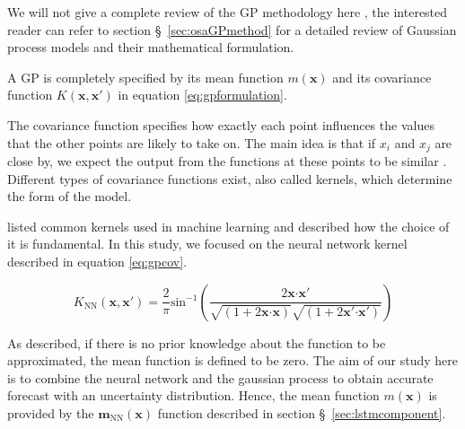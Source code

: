 We will not give a complete review of the GP methodology here , the interested reader can refer to 
section \S~\ref{sec:osaGPmethod} for a detailed review of Gaussian process models and their mathematical formulation.

A GP is completely specified by its mean function  \( m \left( \mathbf{x} \right)  \) and its covariance function  
\( K (\mathbf{x}, \mathbf{x}') \)  in equation \ref{eq:gpformulation}. 

The covariance function specifies how exactly each point influences the values that the other points are 
likely to take on. The main idea is that if  \( x_{i} \) and  \( x_{j} \)  are close by, 
we expect the output from the functions at these points to be similar . Different types of covariance 
functions exist, also called kernels, which determine the form of the model. 

\citet{ChandorkarDst} listed common kernels used in machine learning and described how the choice of 
it is fundamental. In this study, we focused on the neural network kernel \citep{williams1998computation} 
described in equation \ref{eq:gpcov}. 


\begin{equation}\label{eq:gpcov}
 K_{\text{NN}} \left( \mathbf{x}, \mathbf{x}' \right) = 
 \frac{2}{ \pi } \text{sin}^{-1} \left( \frac{2\mathbf{x}\boldsymbol{\cdot}\mathbf{x}'}{
	 \sqrt{ \left( 1+2\mathbf{x}\boldsymbol{\cdot} \mathbf{x} \right) }\sqrt{ \left( 1+2\mathbf{x}'\boldsymbol{\cdot}\mathbf{x}' \right)}
	 } \right)
\end{equation}


As \citet{Rasmussen:2005:GPM:1162254} described, if there is no prior knowledge about 
the function to be approximated, the mean function is defined to be zero. The aim of our study here is to 
combine the neural network and the gaussian process to obtain accurate forecast with an uncertainty distribution. 
Hence, the mean function  \( m \left( \mathbf{x} \right)  \)  is provided by the  \( \textbf{m}_{\text{NN}} \left( \mathbf{x} \right)  \)  
function described in section \S~\ref{sec:lstmcomponent}.






